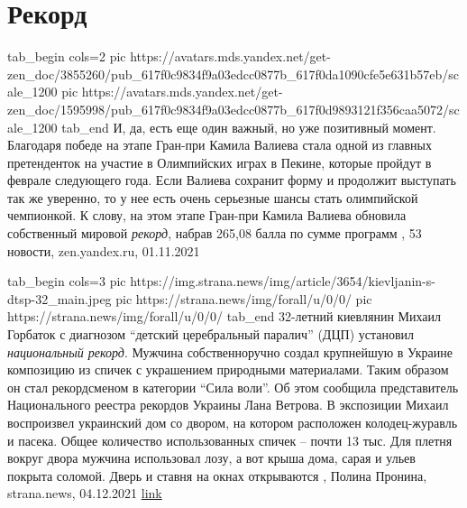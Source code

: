  
 
 
 
 
\chapter{Рекорд}

\ifcmt
  tab_begin cols=2
     pic https://avatars.mds.yandex.net/get-zen_doc/3855260/pub_617f0c9834f9a03edcc0877b_617f0da1090cfe5e631b57eb/scale_1200
     pic https://avatars.mds.yandex.net/get-zen_doc/1595998/pub_617f0c9834f9a03edcc0877b_617f0d9893121f356caa5072/scale_1200
  tab_end
\fi
И, да, есть еще один важный, но уже позитивный момент. Благодаря победе на
этапе Гран-при Камила Валиева стала одной из главных претенденток на участие в
Олимпийских играх в Пекине, которые пройдут в феврале следующего года. Если
Валиева сохранит форму и продолжит выступать так же уверенно, то у нее есть
очень серьезные шансы стать олимпийской чемпионкой.  К слову, на этом этапе
Гран-при Камила Валиева обновила собственный мировой \emph{рекорд}, набрав
265,08 балла по сумме программ
, 
53 новости, zen.yandex.ru, 01.11.2021

\ifcmt
  tab_begin cols=3
     pic https://img.strana.news/img/article/3654/kievljanin-s-dtsp-32_main.jpeg
     pic https://strana.news/img/forall/u/0/0/%
		 pic https://strana.news/img/forall/u/0/0/%
  tab_end
\fi
32-летний киевлянин Михаил Горбаток с диагнозом \enquote{детский церебральный паралич}
(ДЦП) установил \emph{национальный рекорд}. Мужчина собственноручно создал крупнейшую
в Украине композицию из спичек с украшением природными материалами. Таким
образом он стал рекордсменом в категории \enquote{Сила воли}.  Об этом сообщила
представитель Национального реестра рекордов Украины Лана Ветрова.  В
экспозиции Михаил воспроизвел украинский дом со двором, на котором расположен
колодец-журавль и пасека.  Общее количество использованных спичек – почти 13
тыс. Для плетня вокруг двора мужчина использовал лозу, а вот крыша дома, сарая
и ульев покрыта соломой. Дверь и ставня на окнах открываются
, 
Полина Пронина, strana.news, 04.12.2021
\href{https://strana.news/news/365432-kievljanin-s-dtsp-ustanovil-rekord-sozdav-krupnejshuju-v-ukraine-ekspozitsiju-iz-spichek.html}{link}
